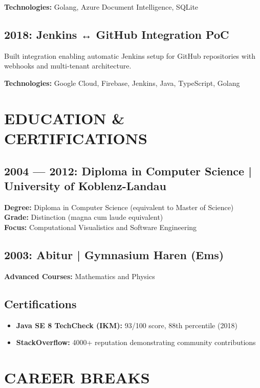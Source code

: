 \documentclass[10pt,a4paper]{article}
\begin{document}
\textbf{Technologies:} Golang, Azure Document Intelligence, SQLite

\subsection{2018: Jenkins ↔ GitHub Integration PoC}
Built integration enabling automatic Jenkins setup for GitHub repositories with webhooks and multi-tenant architecture.

\textbf{Technologies:} Google Cloud, Firebase, Jenkins, Java, TypeScript, Golang

\vspace{6pt}

\section{EDUCATION \& CERTIFICATIONS}

\subsection{2004 — 2012: Diploma in Computer Science | University of Koblenz-Landau}
\textbf{Degree:} Diploma in Computer Science (equivalent to Master of Science)\\
\textbf{Grade:} Distinction (magna cum laude equivalent)\\
\textbf{Focus:} Computational Visualistics and Software Engineering

\subsection{2003: Abitur | Gymnasium Haren (Ems)}
\textbf{Advanced Courses:} Mathematics and Physics

\subsection{Certifications}
\begin{itemize}
    \item \textbf{Java SE 8 TechCheck (IKM):} 93/100 score, 88th percentile (2018)
    \item \textbf{StackOverflow:} 4000+ reputation demonstrating community contributions
\end{itemize}

\vspace{6pt}

\section{CAREER BREAKS}
\end{document}
